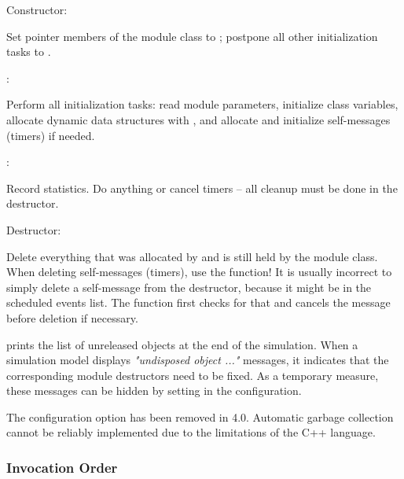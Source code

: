 \begin{description}

\item Constructor:

Set pointer members of the module class to ; postpone all other
initialization tasks to .

\item {}:

Perform all initialization tasks: read module parameters, initialize
class variables, allocate dynamic data structures with ,
and allocate and initialize self-messages (timers) if needed.

\item {}:

Record statistics. Do   anything or cancel timers --
all cleanup must be done in the destructor.

\item Destructor:

Delete everything that was allocated by  and is still held
by the module class. When deleting self-messages (timers), use the
 function! It is usually incorrect
to simply delete a self-message from the destructor, because it might be
in the scheduled events list. The  function
first checks for that and cancels the message before deletion if necessary.

\end{description}

{\opp} prints the list of unreleased objects at the end of the simulation.
When a simulation model displays \textit{"undisposed object ..."} messages, it indicates
that the corresponding module destructors need to be fixed. As a temporary measure, these
messages can be hidden by setting  in the
configuration.

\begin{note}
    The  configuration option has been removed in {\opp} 4.0.
    Automatic garbage collection cannot be reliably implemented due to the
    limitations of the C++ language.
\end{note}


\subsubsection{Invocation Order}
\label{sec:simple-modules:init-finish:invocation-order}

